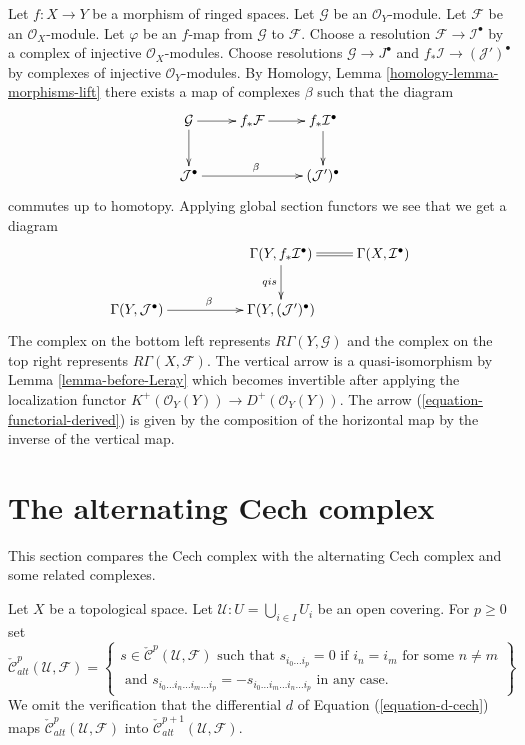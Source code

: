 \begin{remark}
\label{remark-explain-arrow}
Let $f : X \to Y$ be a morphism of ringed spaces.
Let $\mathcal{G}$ be an $\mathcal{O}_Y$-module.
Let $\mathcal{F}$ be an $\mathcal{O}_X$-module.
Let $\varphi$ be an $f$-map from $\mathcal{G}$ to $\mathcal{F}$.
Choose a resolution $\mathcal{F} \to \mathcal{I}^\bullet$
by a complex of injective $\mathcal{O}_X$-modules.
Choose resolutions $\mathcal{G} \to J^\bullet$ and
$f_*\mathcal{I} \to (\mathcal{J}')^\bullet$ by complexes
of injective $\mathcal{O}_Y$-modules. By
Homology, Lemma \ref{homology-lemma-morphisms-lift}
there exists a map of complexes
$\beta$ such that the diagram
$$
\xymatrix{
\mathcal{G} \ar[d] \ar[r] &
f_*\mathcal{F} \ar[r] &
f_*\mathcal{I}^\bullet \ar[d] \\
\mathcal{J}^\bullet \ar[rr]^\beta & &
(\mathcal{J}')^\bullet
}
$$
commutes up to homotopy. Applying global section functors we see
that we get a diagram
$$
\xymatrix{
 & & \Gamma(Y, f_*\mathcal{I}^\bullet) \ar[d]_{qis} \ar@{=}[r] &
\Gamma(X, \mathcal{I}^\bullet) \\
\Gamma(Y, \mathcal{J}^\bullet) \ar[rr]^\beta & &
\Gamma(Y, (\mathcal{J}')^\bullet) &
}
$$
The complex on the bottom left represents $R\Gamma(Y, \mathcal{G})$
and the complex on the top right represents $R\Gamma(X, \mathcal{F})$.
The vertical arrow is a quasi-isomorphism by
Lemma \ref{lemma-before-Leray} which becomes invertible after
applying the localization functor
$K^{+}(\mathcal{O}_Y(Y)) \to D^{+}(\mathcal{O}_Y(Y))$.
The arrow (\ref{equation-functorial-derived}) is given by the
composition of the horizontal map by the inverse of the vertical map.
\end{remark}
















\section{The alternating Cech complex}
\label{section-alternating-cech}

\noindent
This section compares the Cech complex with the alternating Cech
complex and some related complexes.

\medskip\noindent
Let $X$ be a topological space. Let $\mathcal{U} : U = \bigcup_{i \in I} U_i$
be an open covering. For $p \geq 0$ set
$$
\check{\mathcal{C}}_{alt}^p(\mathcal{U}, \mathcal{F})
=
\left\{
\begin{matrix}
s \in  \check{\mathcal{C}}^p(\mathcal{U}, \mathcal{F})
\text{ such that }
s_{i_0 \ldots i_p} = 0 \text{ if } i_n = i_m \text{ for some } n \not = m\\
\text{ and }
s_{i_0\ldots i_n \ldots i_m \ldots i_p}
=
-s_{i_0\ldots i_m \ldots i_n \ldots i_p}
\text{ in any case.}
\end{matrix}
\right\}
$$
We omit the verification that the differential $d$ of
Equation (\ref{equation-d-cech}) maps
$\check{\mathcal{C}}^p_{alt}(\mathcal{U}, \mathcal{F})$ into 
$\check{\mathcal{C}}^{p + 1}_{alt}(\mathcal{U}, \mathcal{F})$.

